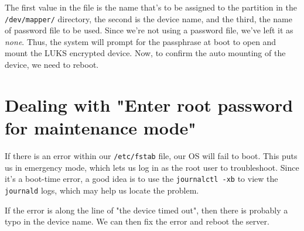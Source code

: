 \noindent
The first value in the file is the name that's to be assigned to the partition in the \verb|/dev/mapper/| directory, the second is the device name, and the third, the name of password file to be used. Since we're not using a password file, we've left it as \textit{none}. Thus, the system will prompt for the passphrase at boot to open and mount the LUKS encrypted device. Now, to confirm the auto mounting of the device, we need to reboot. 

\section{Dealing with "Enter root password for maintenance mode"}
If there is an error within our \verb|/etc/fstab| file, our OS will fail to boot. This puts us in emergency mode, which lets us log in as the root user to troubleshoot. Since it's a boot-time error, a good idea is to use the \verb|journalctl -xb| to view the \verb|journald| logs, which may help us locate the problem. 

If the error is along the line of "the device timed out", then there is probably a typo in the device name. We can then fix the error and reboot the server.